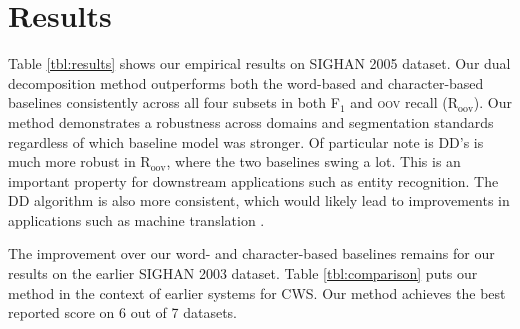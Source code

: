 \section{Results}

Table \ref{tbl:results} shows our empirical results on SIGHAN 2005 dataset. Our dual decomposition method outperforms both the word-based and character-based baselines  consistently across all four subsets in both F$_1$ and \textsc{oov} recall (R$_{\mathrm{oov}}$). Our method demonstrates a robustness across domains and segmentation standards regardless of which baseline model was stronger. Of particular note is DD's is much more robust in R$_{\mathrm{oov}}$, where the two baselines swing a lot. This is an important property for downstream applications such as entity recognition. The DD algorithm is also more consistent, which would likely lead to improvements in applications such as machine translation \cite{Chang:2008:ACL}. 

The improvement over our word- and character-based baselines remains for our results on the earlier SIGHAN 2003 dataset.
Table \ref{tbl:comparison} puts our method in the context of earlier systems for CWS. Our method achieves the best reported score on 6 out of 7 datasets.


